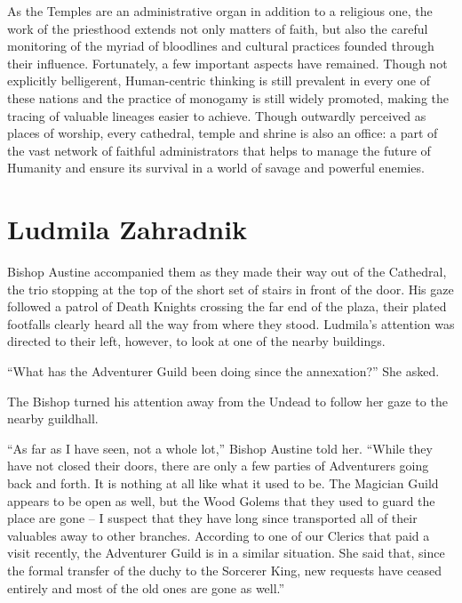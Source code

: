  

As the Temples are an administrative organ in addition to a religious one, the work of the priesthood extends not only matters of faith, but also the careful monitoring of the myriad of bloodlines and cultural practices founded through their influence. Fortunately, a few important aspects have remained. Though not explicitly belligerent, Human-centric thinking is still prevalent in every one of these nations and the practice of monogamy is still widely promoted, making the tracing of valuable lineages easier to achieve. Though outwardly perceived as places of worship, every cathedral, temple and shrine is also an office: a part of the vast network of faithful administrators that helps to manage the future of Humanity and ensure its survival in a world of savage and powerful enemies.

\chapter{Ludmila Zahradnik}

Bishop Austine accompanied them as they made their way out of the Cathedral, the trio stopping at the top of the short set of stairs in front of the door. His gaze followed a patrol of Death Knights crossing the far end of the plaza, their plated footfalls clearly heard all the way from where they stood. Ludmila’s attention was directed to their left, however, to look at one of the nearby buildings.

 

“What has the Adventurer Guild been doing since the annexation?” She asked.

 

The Bishop turned his attention away from the Undead to follow her gaze to the nearby guildhall.

 

“As far as I have seen, not a whole lot,” Bishop Austine told her. “While they have not closed their doors, there are only a few parties of Adventurers going back and forth. It is nothing at all like what it used to be. The Magician Guild appears to be open as well, but the Wood Golems that they used to guard the place are gone – I suspect that they have long since transported all of their valuables away to other branches. According to one of our Clerics that paid a visit recently, the Adventurer Guild is in a similar situation. She said that, since the formal transfer of the duchy to the Sorcerer King, new requests have ceased entirely and most of the old ones are gone as well.”

